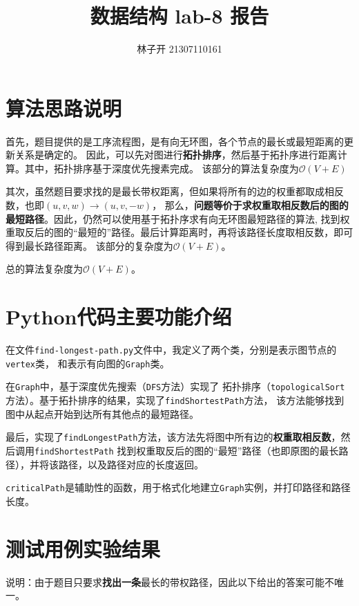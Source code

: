 \documentclass{article}
\title{数据结构 lab-8 报告}
\author{林子开 21307110161}
\begin{document}
	\maketitle
	\tableofcontents
\section{算法思路说明}
首先，题目提供的是工序流程图，是有向无环图，各个节点的最长或最短距离的更新关系是确定的。
因此，可以先对图进行\textbf{拓扑排序}，然后基于拓扑序进行距离计算。其中，拓扑排序基于深度优先搜素完成。
该部分的算法复杂度为$\mathcal{O}(V+E)$

其次，虽然题目要求找的是最长带权距离，但如果将所有的边的权重都取成相反数，也即$(u,v,w)\rightarrow(u,v,-w)$，
那么，\textbf{问题等价于求权重取相反数后的图的最短路径}。因此，仍然可以使用基于拓扑序求有向无环图最短路径的算法,
找到权重取反后的图的“最短的”路径。最后计算距离时，再将该路径长度取相反数，即可得到最长路径距离。
该部分的复杂度为$\mathcal{O}(V+E)$。

总的算法复杂度为$\mathcal{O}(V+E)$。

\section{Python代码主要功能介绍}
在文件\texttt{find-longest-path.py}文件中，我定义了两个类，分别是表示图节点的\texttt{vertex}类，
和表示有向图的\texttt{Graph}类。

在\texttt{Graph}中，基于深度优先搜索（\texttt{DFS}方法）实现了
拓扑排序（\texttt{topologicalSort}方法）。基于拓扑排序的结果，实现了\texttt{findShortestPath}方法，
该方法能够找到图中从起点开始到达所有其他点的最短路径。

最后，实现了\texttt{findLongestPath}方法，该方法先将图中所有边的\textbf{权重取相反数}，然后调用\texttt{findShortestPath}
找到权重取反后的图的“最短”路径（也即原图的最长路径），并将该路径，以及路径对应的长度返回。

\texttt{criticalPath}是辅助性的函数，用于格式化地建立\texttt{Graph}实例，并打印路径和路径长度。

\section{测试用例实验结果}
说明：由于题目只要求\textbf{找出一条}最长的带权路径，因此以下给出的答案可能不唯一。
\end{document}
